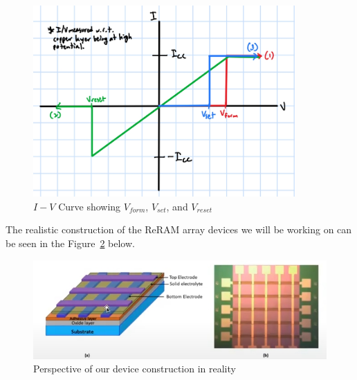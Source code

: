 \documentclass{article}
\begin{document}
          \begin{figure}[H]
            \centering
            \includegraphics[width=10cm]{./figures/characterizationcurve.jpg}
            \caption{$I-V$ Curve showing $V_{form}$, $V_{set}$, and $V_{reset}$}
            \label{setCurve}
          \end{figure}

          The realistic construction of the ReRAM array devices we will be working on can be seen in the
          Figure~\ref{realview} below.
          \begin{figure}[H]
            \centering
            \includegraphics[width=\textwidth]{./figures/realview.jpg}
            \caption{Perspective of our device construction in reality}
            \label{realview}
          \end{figure}
        
        \newpage
\end{document}
